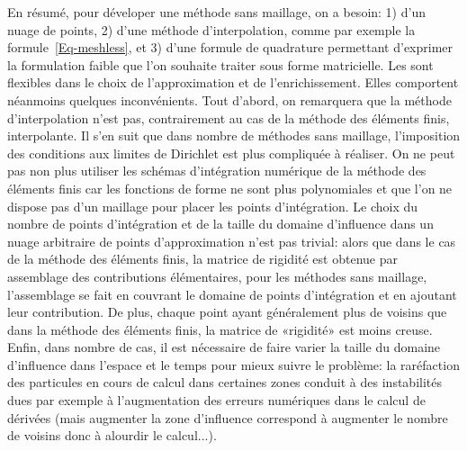 \medskip
En résumé, pour déveloper une méthode sans maillage, on a besoin: 1) d'un nuage de points, 2) d'une méthode d'interpolation, comme par exemple la formule~\ref{Eq-meshless}, et 3) d'une formule de quadrature permettant d'exprimer la formulation faible que l'on souhaite traiter sous forme matricielle.
Les  sont flexibles dans le choix de l'approximation et de l'enrichissement. Elles comportent néanmoins quelques inconvénients.
Tout d'abord, on remarquera que la méthode d'interpolation n'est pas, contrairement au cas de la méthode des éléments finis, interpolante. Il s'en suit que dans nombre de méthodes sans maillage, l'imposition des conditions aux limites de Dirichlet est plus compliquée à réaliser.
On ne peut pas non plus utiliser les schémas d'intégration numérique de la méthode des éléments finis car les fonctions de forme ne sont plus polynomiales et que l'on ne dispose pas d'un maillage pour placer les points d'intégration. Le choix du nombre de points d'intégration et de la taille du domaine d'influence dans un nuage arbitraire de points d'approximation n'est pas trivial: alors que dans le cas de la méthode des éléments finis, la matrice de rigidité est obtenue par assemblage des contributions élémentaires, pour les méthodes sans maillage, l'assemblage se fait en couvrant le domaine de points d'intégration et en ajoutant leur contribution. De plus, chaque point ayant généralement plus de voisins que dans la méthode des éléments finis, la matrice de «rigidité» est moins creuse. Enfin, dans nombre de cas, il est nécessaire de faire varier la taille du domaine d'influence dans l'espace et le temps pour mieux suivre le problème: la raréfaction des particules en cours de calcul dans certaines zones conduit à des instabilités dues par exemple à l'augmentation des erreurs numériques dans le calcul de dérivées (mais augmenter la zone d'influence correspond à augmenter le nombre de voisins donc à alourdir le calcul...).

\medskip
